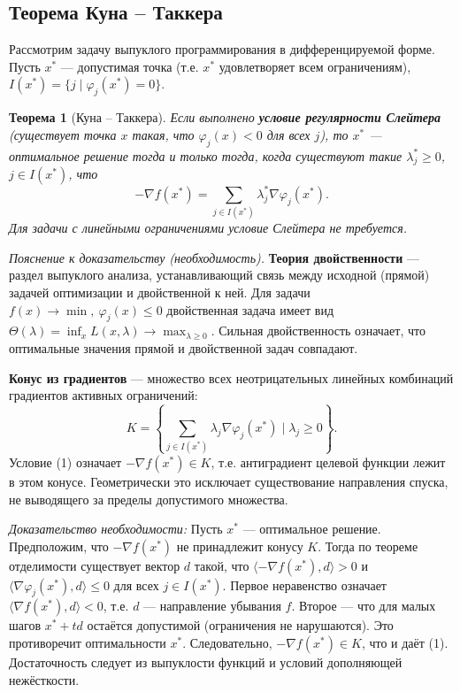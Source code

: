\documentclass{article}
\theoremstyle{plain}
\newtheorem{theorem}{Теорема}[section]
\begin{document}
\subsection{Теорема Куна – Таккера}
Рассмотрим задачу выпуклого программирования в дифференцируемой форме. Пусть $x^*$ — допустимая точка (т.е. $x^*$ удовлетворяет всем ограничениям), $I(x^*) = \{j \mid \varphi_j(x^*) = 0\}$.

\begin{theorem}[Куна – Таккера]
Если выполнено \textbf{условие регулярности Слейтера} (существует точка $x$ такая, что $\varphi_j(x) < 0$ для всех $j$), то $x^*$ — оптимальное решение тогда и только тогда, когда существуют такие $\lambda_j^* \ge 0$, $j \in I(x^*)$, что
\[
-\nabla f(x^*) = \sum_{j \in I(x^*)} \lambda_j^* \nabla \varphi_j(x^*). \tag{1}
\]
Для задачи с линейными ограничениями условие Слейтера не требуется.
\end{theorem}

\textit{Пояснение к доказательству (необходимость).} 
\textbf{Теория двойственности} — раздел выпуклого анализа, устанавливающий связь между исходной (прямой) задачей оптимизации и двойственной к ней. Для задачи $f(x)\to\min,\ \varphi_j(x)\le0$ двойственная задача имеет вид $\Theta(\lambda)=\inf_x L(x,\lambda)\to\max_{\lambda\ge0}$. Сильная двойственность означает, что оптимальные значения прямой и двойственной задач совпадают.

\textbf{Конус из градиентов} — множество всех неотрицательных линейных комбинаций градиентов активных ограничений:
\[
K = \left\{ \sum_{j\in I(x^*)} \lambda_j \nabla \varphi_j(x^*) \mid \lambda_j \ge 0 \right\}.
\]
Условие (1) означает $-\nabla f(x^*) \in K$, т.е. антиградиент целевой функции лежит в этом конусе. Геометрически это исключает существование направления спуска, не выводящего за пределы допустимого множества.

\textit{Доказательство необходимости:} Пусть $x^*$ — оптимальное решение. Предположим, что $-\nabla f(x^*)$ не принадлежит конусу $K$. Тогда по теореме отделимости существует вектор $d$ такой, что $\langle -\nabla f(x^*), d \rangle > 0$ и $\langle \nabla \varphi_j(x^*), d \rangle \le 0$ для всех $j\in I(x^*)$. Первое неравенство означает $\langle \nabla f(x^*), d \rangle < 0$, т.е. $d$ — направление убывания $f$. Второе — что для малых шагов $x^*+td$ остаётся допустимой (ограничения не нарушаются). Это противоречит оптимальности $x^*$. Следовательно, $-\nabla f(x^*)\in K$, что и даёт (1). Достаточность следует из выпуклости функций и условий дополняющей нежёсткости.
\end{document}
